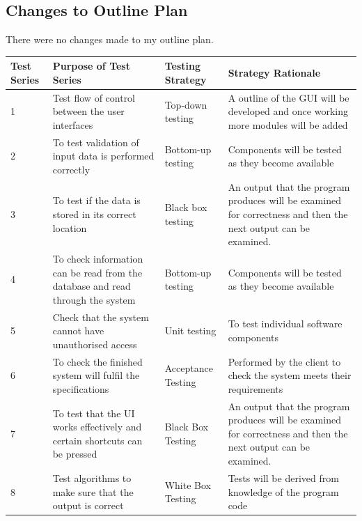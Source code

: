\begin{landscape}
\begin{center}
\begin{tabular}{|p{2cm}|p{5cm}|p{5cm}|p{4cm}|}
    \end{tabular}
\end{center}

\subsection{Changes to Outline Plan}

There were no changes made to my outline plan.

\begin{center}
    \begin{tabular}{|p{2cm}|p{5cm}|p{5cm}|p{4cm}|}
        \hline
        \textbf{Test Series} & \textbf{Purpose of Test Series} & \textbf{Testing Strategy} & \textbf{Strategy Rationale}\\ \hline
1 & Test flow of control between the user interfaces & Top-down testing & A outline of the GUI will be developed and once working more modules will be added \\ \hline
       2 & To test validation of input data is performed correctly & Bottom-up testing & Components will be tested as they become available \\ \hline
3 & To test if the data is stored in its correct location & Black box testing & An output that the program produces will be examined for correctness and then the next output can be examined.\\ \hline
4 & To check information can be read from the database and read through the system & Bottom-up testing &  Components will be tested as they become available\\ \hline
5 & Check that the system cannot have unauthorised access & Unit testing & To test individual software components \\ \hline
6 & To check the finished system will fulfil the specifications &  Acceptance Testing & Performed by the client to check the system meets their requirements\\ \hline
7 & To test that the UI works effectively and certain shortcuts can be pressed & Black Box Testing & An output that the program produces will be examined for correctness and then the next output can be examined.\\ \hline
8 & Test algorithms to make sure that the output is correct & White Box Testing & Tests will be derived from knowledge of the program code \\ \hline

    \end{tabular}
\end{center}


\end{landscape}
